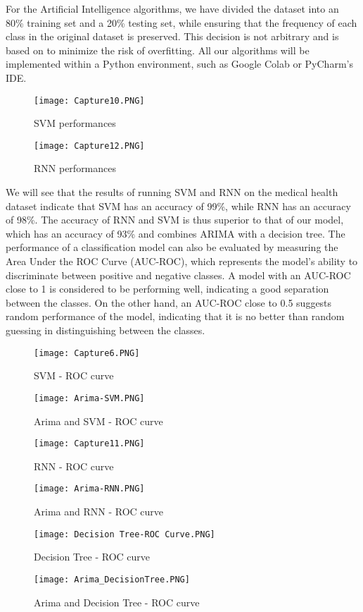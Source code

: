 \documentclass[conference]{IEEEtran}
\begin{document}
For the Artificial Intelligence algorithms, we have divided the dataset into an 80\% training set and a 20\% testing set, while ensuring that the frequency of each class in the original dataset is preserved. This decision is not arbitrary and is based on \cite{b10} to minimize the risk of overfitting.
All our algorithms will be implemented within a Python environment, such as Google Colab or PyCharm's IDE.

\begin{figure}[htbp]
    \centering
    \texttt{[image: Capture10.PNG]}
    \caption{SVM performances}
    \label{fig:my_label}
\end{figure}

\begin{figure}[htbp]
    \centering
    \texttt{[image: Capture12.PNG]}
    \caption{RNN performances}
    \label{fig:my_label}
\end{figure}




We will see that the results of running SVM and RNN on the medical health dataset indicate that SVM has an accuracy of 99\%, while RNN has an accuracy of 98\%.
The accuracy of RNN and SVM is thus superior to that of our model, which has an accuracy of 93\% and combines ARIMA with a decision tree.
The performance of a classification model can also be evaluated by measuring the Area Under the ROC Curve (AUC-ROC), which represents the model's ability to discriminate between positive and negative classes. A model with an AUC-ROC close to 1 is considered to be performing well, indicating a good separation between the classes. On the other hand, an AUC-ROC close to 0.5 suggests random performance of the model, indicating that it is no better than random guessing in distinguishing between the classes.

\begin{figure}[htbp]
    \centering
    \texttt{[image: Capture6.PNG]}
    \caption{SVM - ROC curve}
    \label{fig:my_label}
\end{figure}
\begin{figure}[htbp]
    \centering
    \texttt{[image: Arima-SVM.PNG]}
    \caption{Arima and SVM - ROC curve}
    \label{fig:my_label}
\end{figure}
\begin{figure}[htbp]
    \centering
    \texttt{[image: Capture11.PNG]}
    \caption{RNN - ROC curve}
    \label{fig:my_label}
\end{figure}
\begin{figure}[htbp]
    \centering
    \texttt{[image: Arima-RNN.PNG]}
    \caption{Arima and RNN - ROC curve}
    \label{fig:my_label}
\end{figure}
\begin{figure}[htbp]
    \centering
    \texttt{[image: Decision Tree-ROC Curve.PNG]}
    \caption{Decision Tree - ROC curve}
    \label{fig:my_label}
\end{figure}
\begin{figure}[htbp]
    \centering
    \texttt{[image: Arima\_DecisionTree.PNG]}
    \caption{Arima and Decision Tree - ROC curve}
    \label{fig:my_label}
\end{figure}
\end{document}
